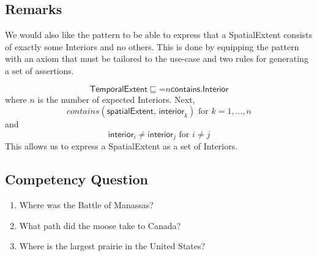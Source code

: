 \subsection{Remarks}
\label{rem:Spatial}
We would also like the pattern to be able to express that a \textsf{SpatialExtent} consists of exactly some \textsf{Interiors} and no others. This is done by equipping the pattern with an axiom that must be tailored to the use-case and two rules for generating a set of assertions.

\begin{equation}
\textsf{TemporalExtent} \sqsubseteq \mathord{=}n\textsf{contains.Interior}
\end{equation}
where $n$ is the number of expected \textsf{Interiors}. Next,
$$\textit{contains}(\textsf{spatialExtent, interior}_k) \text{ for } k=1,...,n$$
and
$$\textsf{interior}_i \not = \textsf{interior}_j \text{ for } i \not = j$$
This allows us to express a \textsf{SpatialExtent} as a set of \textsf{Interiors}.
\subsection{Competency Question}
\label{cqs:Spatial}
\begin{enumerate}[CQ1.]
\item Where was the Battle of Manassas?
\item What path did the moose take to Canada?
\item Where is the largest prairie in the United States?
\end{enumerate}

\newpage
